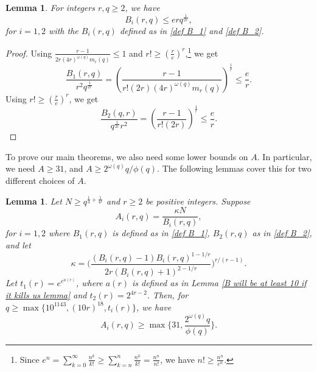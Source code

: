 \documentclass[12pt]{amsart}
\theoremstyle{plain}
\newtheorem{lemma}[theorem]{Lemma}
\theoremstyle{definition}
\begin{document}
\begin{lemma} \label{B upper bound lemma}
For integers $r, q\ge2$, we have 
$$B_i(r,q) \le erq^{\frac{1}{2r}},$$ 
for $i = 1,2$ with the $B_i(r, q)$ defined as in \eqref{def B_1} and \eqref{def B_2}. 
\end{lemma}

\begin{proof}
Using $\frac{r-1}{2r (4r)^{\omega(q)} m_r(q)} \le 1$ and $r! \ge \left(\frac{r}{e}\right)^r$,\footnote{Since $e^n = \sum_{k=0}^\infty \frac{n^k}{k!} \ge \sum_{k=n}^n \frac{n^k}{k!} = \frac{n^n}{n!}$, we have $n! \ge \frac{n^n}{e^n}$.} we get
$$\frac{B_1(r,q)}{r^2q^{\frac{1}{2r}}} = \left(\frac{r-1}{r! (2r)(4r)^{\omega(q)}m_r(q)}\right)^{\frac{1}{r}} \le \frac{e}{r}.$$
Using $r! \ge \left(\frac{r}{e}\right)^r$, we get
$$\frac{B_2(q,r)}{q^{\frac{1}{2r}}r^2} = \left(\frac{r-1}{r!(2r)}\right)^{\frac{1}{r}} \le \frac{e}{r}.$$

\end{proof}


To prove our main theorems, we also need some lower bounds on $A$. In particular, we need $A \ge 31$, and $A\ge 2^{\omega(q)} q /\phi(q)$. The following lemmas cover this for two different choices of $A$.

\begin{lemma} \label{A lower bound lemma}
Let $N \ge q^{\frac{1}{4}+\frac{1}{4r}}$ and $r\ge 2$ be positive integers. Suppose 
$$A_i(r,q) = \frac{\kappa N}{B_i(r,q)},$$
for $i=1,2$ where $B_1(r,q)$ is defined as in \eqref{def B_1}, $B_2(r,q)$ as in \eqref{def B_2}, and let
\begin{equation} \label{choice of kappa}
\kappa = \biggl( \frac{(B_i(r,q)-1) B_i(r,q)^{1-1/r} }{2 r (B_i(r,q)+1)^{2-1/r}}
\biggr)^{r/(r-1)}.
\end{equation}
Let $t_1(r) = e^{e^{a(r)}}$, where $a(r)$ is defined as in Lemma \ref{B will be at least 10 if it kills us lemma} and $t_2(r) = 2^{4r-2}$. Then, for $q\ge \max\bigl\{ 10^{1143}, (10r)^{18}, t_i(r) \bigr\}$, we have 
$$A_i(r,q) \ge \max\biggl\{31, \frac{2^{\omega(q)}q}{\phi(q)}\biggl\}.$$
\end{lemma}
\end{document}
